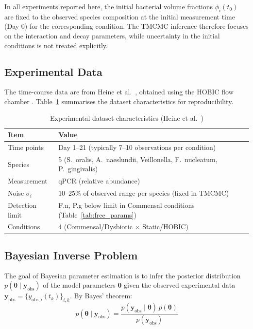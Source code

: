 \documentclass[11pt,a4paper]{article}
\begin{document}
In all experiments reported here, the initial bacterial volume fractions $\phi_i(t_0)$ are fixed to the observed species composition at the initial measurement time (Day 0) for the corresponding condition. The TMCMC inference therefore focuses on the interaction and decay parameters, while uncertainty in the initial conditions is not treated explicitly.

\subsection{Experimental Data}
\label{sec:exp_data}

The time-course data are from Heine et al.~\cite{Heine2025PeriImplant}, obtained using the HOBIC flow chamber \cite{Kommerein2018HOBIC}. Table~\ref{tab:exp_data_detail} summarises the dataset characteristics for reproducibility.

\begin{table}[H]
\centering
\caption{Experimental dataset characteristics (Heine et al.~\cite{Heine2025PeriImplant})}
\label{tab:exp_data_detail}
\begin{tabular}{ll}
\toprule
\textbf{Item} & \textbf{Value} \\
\midrule
Time points & Day 1--21 (typically 7--10 observations per condition) \\
Species & 5 (S.~oralis, A.~naeslundii, Veillonella, F.~nucleatum, P.~gingivalis) \\
Measurement & qPCR (relative abundance) \\
Noise $\sigma_i$ & 10--25\% of observed range per species (fixed in TMCMC) \\
Detection limit & F.n, P.g below limit in Commensal conditions (Table~\ref{tab:free_params}) \\
Conditions & 4 (Commensal/Dysbiotic $\times$ Static/HOBIC) \\
\bottomrule
\end{tabular}
\end{table}

\subsection{Bayesian Inverse Problem}

The goal of Bayesian parameter estimation is to infer the posterior distribution $p(\boldsymbol{\theta} \mid \mathbf{y}_{\mathrm{obs}})$ of the model parameters $\boldsymbol{\theta}$ given the observed experimental data $\mathbf{y}_{\mathrm{obs}} = \{y_{\mathrm{obs},i}(t_k)\}_{i,k}$. By Bayes' theorem:
\begin{equation}
p(\boldsymbol{\theta} \mid \mathbf{y}_{\mathrm{obs}}) = \frac{p(\mathbf{y}_{\mathrm{obs}} \mid \boldsymbol{\theta})\, p(\boldsymbol{\theta})}{p(\mathbf{y}_{\mathrm{obs}})}
\label{eq:bayes}
\end{equation}
\end{document}
